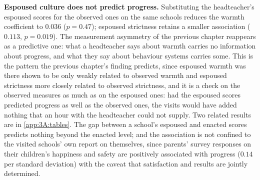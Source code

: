 \textbf{Espoused culture does not predict progress.} Substituting the
headteacher's espoused scores for the observed ones on the same schools
reduces the warmth coefficient to $0.036$ ($p = 0.47$); espoused strictness
retains a smaller association ($0.113$, $p = 0.019$). The measurement
asymmetry of the previous chapter reappears as a predictive one: what a
headteacher says about warmth carries no information about progress, and what
they say about behaviour systems carries some. This is the pattern the
previous chapter's finding predicts, since espoused warmth was there shown to
be only weakly related to observed warmth and espoused strictness more
closely related to observed strictness, and it is a check on the observed
measures as much as on the espoused ones: had the espoused scores predicted
progress as well as the observed ones, the visits would have added nothing
that an hour with the headteacher could not supply. Two related results are
in \cref{app:3A:tables}. The gap between a school's espoused and enacted
scores predicts nothing beyond the enacted level; and the association is not
confined to the visited schools' own report on themselves, since parents'
survey responses on their children's happiness and safety are positively
associated with progress ($0.14$ per standard deviation) with the caveat that
satisfaction and results are jointly determined.

